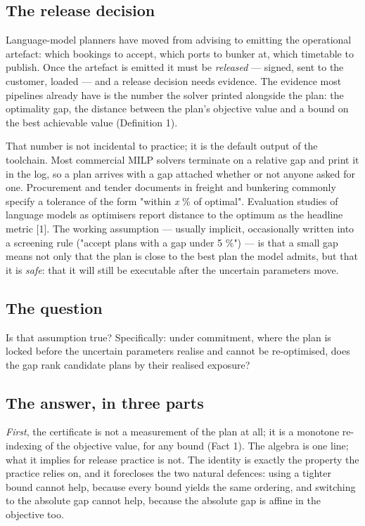 \documentclass[preprint,12pt,letterpaper]{elsarticle}
\theoremstyle{definition}
\theoremstyle{plain}
\begin{document}
\subsection{The release decision}

Language-model planners have moved from advising to emitting the operational artefact: which bookings to accept, which ports to bunker at, which timetable to publish. Once the artefact is emitted it must be \textit{released} --- signed, sent to the customer, loaded --- and a release decision needs evidence. The evidence most pipelines already have is the number the solver printed alongside the plan: the optimality gap, the distance between the plan's objective value and a bound on the best achievable value (Definition 1).

That number is not incidental to practice; it is the default output of the toolchain. Most commercial MILP solvers terminate on a relative gap and print it in the log, so a plan arrives with a gap attached whether or not anyone asked for one. Procurement and tender documents in freight and bunkering commonly specify a tolerance of the form "within \textit{x} \% of optimal". Evaluation studies of language models as optimisers report distance to the optimum as the headline metric [1]. The working assumption --- usually implicit, occasionally written into a screening rule ("accept plans with a gap under 5 \%") --- is that a small gap means not only that the plan is close to the best plan the model admits, but that it is \textit{safe}: that it will still be executable after the uncertain parameters move.

\subsection{The question}

Is that assumption true? Specifically: under commitment, where the plan is locked before the uncertain parameters realise and cannot be re-optimised, does the gap rank candidate plans by their realised exposure?

\subsection{The answer, in three parts}

\textit{First}, the certificate is not a measurement of the plan at all; it is a monotone re-indexing of the objective value, for any bound (Fact 1). The algebra is one line; what it implies for release practice is not. The identity is exactly the property the practice relies on, and it forecloses the two natural defences: using a tighter bound cannot help, because every bound yields the same ordering, and switching to the absolute gap cannot help, because the absolute gap is affine in the objective too.
\end{document}
